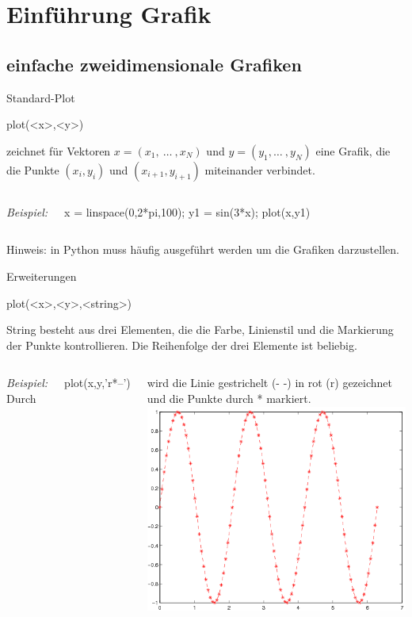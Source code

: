 \documentclass[hyperref={xetex}]{beamer}
\begin{document}
\section{Einf\"uhrung Grafik}
\subsection{einfache zweidimensionale Grafiken}
% 
% 
\begin{frame}[fragile]{Standard-Plot}
\begin{matlabin}
plot(<x>,<y>)
\end{matlabin}
zeichnet für Vektoren $x=(x_1, \ \dots \ ,x_N)$ und  $y=(y_1, \dots \ ,y_N)$
eine Grafik, die die Punkte $(x_i,y_i)$ und $(x_{i+1},y_{i+1})$ miteinander
verbindet.

\begin{columns}[c]
\textit{Beispiel:}
\begin{matlabin}
x = linspace(0,2*pi,100);
y1 = sin(3*x);
plot(x,y1)
\end{matlabin}
\end{columns}
\alert{Hinweis:} in Python muss häufig  ausgeführt werden um die Grafiken darzustellen.
\end{frame}
% 
% 
\begin{frame}[fragile]{Erweiterungen}
\begin{matlabin}
plot(<x>,<y>,<string>)
\end{matlabin}
\alert{String} besteht aus drei Elementen, die die Farbe, Linienstil
und die Markierung der Punkte kontrollieren. Die Reihenfolge der drei
Elemente ist beliebig.
\begin{columns}[c]
\textit{Beispiel:} Durch \\
\begin{matlabin}
plot(x,y,'r*--') 
\end{matlabin}
wird die Linie
gestrichelt (- -) in rot (r) gezeichnet und die Punkte durch *
markiert.
\includegraphics[width=\textwidth]{figures/grafik_2}
\end{columns}
\end{frame}
\end{document}
